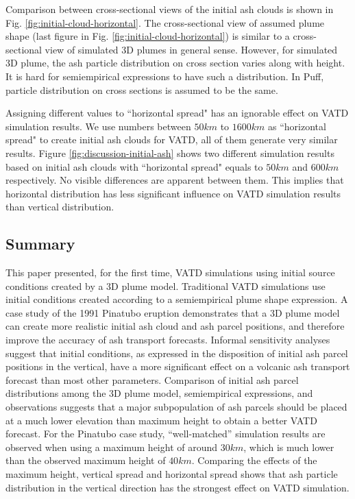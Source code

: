 \documentclass[utf8]{frontiersSCNS} %
\begin{document}
Comparison between cross-sectional views of the initial ash clouds is shown in Fig. \ref{fig:initial-cloud-horizontal}. The cross-sectional view of assumed plume shape (last figure in Fig. \ref{fig:initial-cloud-horizontal}) is similar to a cross-sectional view of simulated 3D plumes in general sense. However, for simulated 3D plume, the ash particle distribution on cross section varies along with height. It is hard for semiempirical expressions to have such a distribution. In Puff, particle distribution on cross sections is assumed to be the same.

Assigning different values to ``horizontal spread" has an ignorable effect on VATD simulation results. We use numbers between $50 km$ to $1600 km$ as ``horizontal spread" to create initial ash clouds for VATD, all of them generate very similar results. Figure \ref{fig:discussion-initial-ash} shows two different simulation results based on initial ash clouds with ``horizontal spread" equals to $50 km$ and $600 km$ respectively. No visible differences are apparent between them. This implies that horizontal distribution has less significant influence on VATD simulation results than vertical distribution.

\subsection{Summary}

This paper presented, for the first time, VATD simulations using initial source conditions created by a 3D plume model. Traditional VATD simulations use initial conditions created according to a semiempirical plume shape expression. A case study of the 1991 Pinatubo eruption demonstrates that a 3D plume model can create more realistic initial ash cloud and ash parcel positions, and therefore improve the accuracy of ash transport forecasts. Informal sensitivity analyses suggest that initial conditions, as expressed in the disposition of initial ash parcel positions in the vertical, have a more significant effect on a volcanic ash transport forecast than most other parameters. Comparison of initial ash parcel distributions among the 3D plume model, semiempirical expressions, and observations suggests that a major subpopulation of ash parcels should be placed at a much lower elevation than maximum height to obtain a better VATD forecast. For the Pinatubo case study, ``well-matched'' simulation results are observed when using a maximum height of around $30 km$, which is much lower than the observed maximum height of $40 km$. Comparing the effects of the maximum height, vertical spread and horizontal spread shows that ash particle distribution in the vertical direction has the strongest effect on VATD simulation.
\end{document}
